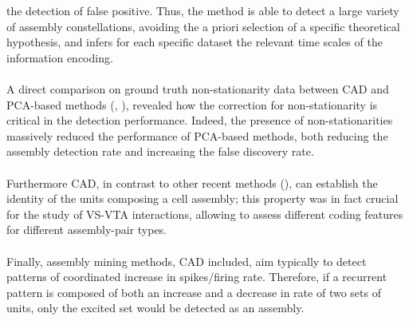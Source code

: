 the detection of false positive. Thus, the method is able to detect a large variety of assembly constellations, avoiding the a priori selection of a specific theoretical hypothesis, and infers for each specific dataset the relevant time scales of the information encoding.\\\\A direct comparison on ground truth non-stationarity data between CAD and PCA-based methods (\cite{Lopes}, \cite{RussoDurstewitz}), revealed how the correction for non-stationarity is critical in the detection performance. Indeed, the presence of non-stationarities massively reduced the performance of PCA-based methods, both reducing the assembly detection rate and increasing the false discovery rate.\\\\Furthermore CAD, in contrast to other recent methods (\cite{Watanabe2019}), can establish the identity of the units composing a cell assembly; this property was in fact crucial for the study of VS-VTA interactions, allowing to assess different coding features for different assembly-pair types.\\\\
Finally, assembly mining methods, CAD included, aim typically to detect patterns of coordinated increase in spikes/firing rate. Therefore, if a recurrent pattern is composed of both an increase and a decrease in rate of two sets of units, only the excited set would be detected as an assembly. 
